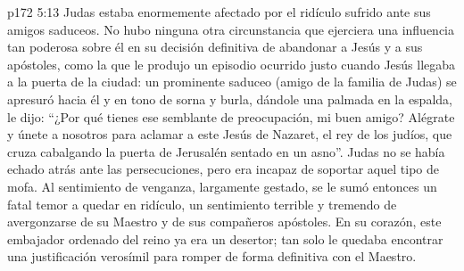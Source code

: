 \vs p172 5:13 Judas estaba enormemente afectado por el ridículo sufrido ante sus amigos saduceos. No hubo ninguna otra circunstancia que ejerciera una influencia tan poderosa sobre él en su decisión definitiva de abandonar a Jesús y a sus apóstoles, como la que le produjo un episodio ocurrido justo cuando Jesús llegaba a la puerta de la ciudad: un prominente saduceo (amigo de la familia de Judas) se apresuró hacia él y en tono de sorna y burla, dándole una palmada en la espalda, le dijo: “¿Por qué tienes ese semblante de preocupación, mi buen amigo? Alégrate y únete a nosotros para aclamar a este Jesús de Nazaret, el rey de los judíos, que cruza cabalgando la puerta de Jerusalén sentado en un asno”. Judas no se había echado atrás ante las persecuciones, pero era incapaz de soportar aquel tipo de mofa. Al sentimiento de venganza, largamente gestado, se le sumó entonces un fatal temor a quedar en ridículo, un sentimiento terrible y tremendo de avergonzarse de su Maestro y de sus compañeros apóstoles. En su corazón, este embajador ordenado del reino ya era un desertor; tan solo le quedaba encontrar una justificación verosímil para romper de forma definitiva con el Maestro.
